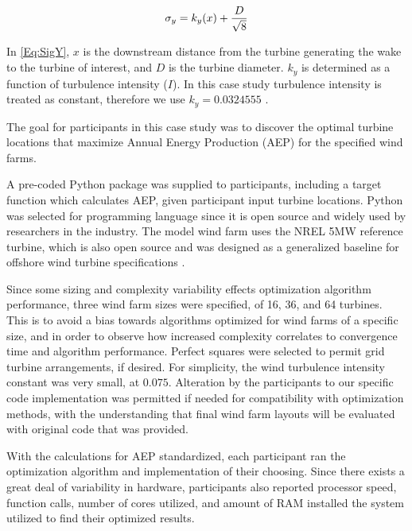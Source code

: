 \documentclass[]{aiaa-tc}
\begin{document}
\begin{equation}
	\sigma_y = k_y(x) + \frac{D}{\sqrt{8}} \\
	\label{Eq:SigY}
\end{equation}

In \cref{Eq:SigY}, $x$ is the downstream distance from the turbine generating the wake to the turbine of interest, and $D$ is the turbine diameter. $k_y$ is determined as a function of turbulence intensity ($I$). In this case study turbulence intensity is treated as constant, therefore we use $k_{y} = 0.0324555$ \cite{Niayifar2016, ThomasBast2018}.


The goal for participants in this case study was to discover the optimal turbine locations that maximize Annual Energy Production (AEP) for the specified wind farms.

A pre-coded Python package was supplied to participants, including a target function which calculates AEP, given participant input turbine locations. Python was selected for programming language since it is open source and widely used by researchers in the industry. The model wind farm uses the NREL 5MW reference turbine, which is also open source and was designed as a generalized baseline for offshore wind turbine specifications \cite{NREL5MW}.

Since some sizing and complexity variability effects optimization algorithm performance, three wind farm sizes were specified, of 16, 36, and 64 turbines. This is to avoid a bias towards algorithms optimized for wind farms of a specific size, and in order to observe how increased complexity correlates to convergence time and algorithm performance. Perfect squares were selected to permit grid turbine arrangements, if desired. For simplicity, the wind turbulence intensity constant was very small, at $0.075$. Alteration by the participants to our specific code implementation was permitted %
if needed for compatibility with optimization methods, with the understanding that final wind farm layouts will be evaluated with original code that was provided.

With the calculations for AEP standardized, each participant ran the optimization algorithm and implementation of their choosing. Since there exists a great deal of variability in hardware, participants also reported processor speed, function calls, number of cores utilized, and amount of RAM installed the system utilized to find their optimized results.
\end{document}
